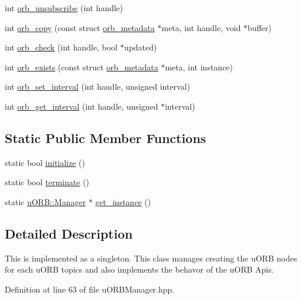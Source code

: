 \begin{DoxyCompactItemize}
\item 
int \hyperlink{classuORB_1_1Manager_a77539878280b749d79d2c16dc5628c81}{orb\+\_\+unsubscribe} (int handle)
\item 
int \hyperlink{classuORB_1_1Manager_af1048c82b439300c706fe0a083b61f90}{orb\+\_\+copy} (const struct \hyperlink{structorb__metadata}{orb\+\_\+metadata} $\ast$meta, int handle, void $\ast$buffer)
\item 
int \hyperlink{classuORB_1_1Manager_a5503920d25d544ce3be1cf79cda869f7}{orb\+\_\+check} (int handle, bool $\ast$updated)
\item 
int \hyperlink{classuORB_1_1Manager_a446823738a75847a6732008784445c9f}{orb\+\_\+exists} (const struct \hyperlink{structorb__metadata}{orb\+\_\+metadata} $\ast$meta, int instance)
\item 
int \hyperlink{classuORB_1_1Manager_aade04ff2a8a3aaf275b39fc32934fc56}{orb\+\_\+set\+\_\+interval} (int handle, unsigned interval)
\item 
int \hyperlink{classuORB_1_1Manager_a627a7e6ef16970d2b6d8f02471795963}{orb\+\_\+get\+\_\+interval} (int handle, unsigned $\ast$interval)
\end{DoxyCompactItemize}
\subsection*{Static Public Member Functions}
\begin{DoxyCompactItemize}
\item 
static bool \hyperlink{classuORB_1_1Manager_abb160fdd7ba0fe448ffa7f654a796267}{initialize} ()
\item 
static bool \hyperlink{classuORB_1_1Manager_a306a9970d2f7cf304fba4a918e238558}{terminate} ()
\item 
static \hyperlink{classuORB_1_1Manager}{u\+O\+R\+B\+::\+Manager} $\ast$ \hyperlink{classuORB_1_1Manager_a9d829b3ea49d16d03c2fa37ef2bb24a5}{get\+\_\+instance} ()
\end{DoxyCompactItemize}


\subsection{Detailed Description}
This is implemented as a singleton. This class manages creating the u\+O\+RB nodes for each u\+O\+RB topics and also implements the behavor of the u\+O\+RB Api\textquotesingle{}s. 

Definition at line 63 of file u\+O\+R\+B\+Manager.\+hpp.



